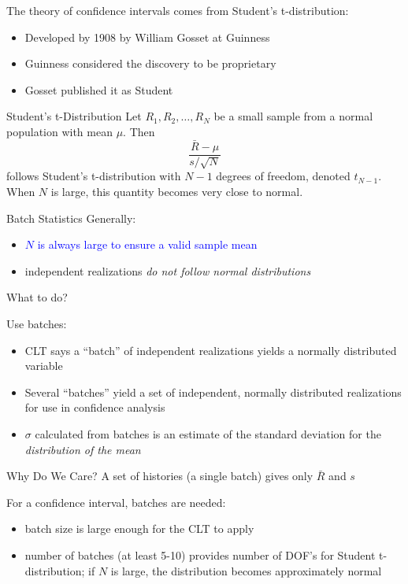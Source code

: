   The theory of confidence intervals comes from Student's t-distribution:
  \begin{itemize}
    \item Developed by 1908 by William Gosset at Guinness
    \item Guinness considered the discovery to be proprietary
    \item Gosset published it as Student
  \end{itemize}
  
{Student's t-Distribution}
 Let $R_{1}, R_{2}, \dots, R_{N}$ be a small sample from a 
 normal population with mean $\mu$. Then 
 \begin{equation*}
   \frac{\bar{R}-\mu}{s / \sqrt{N}}
 \end{equation*}
 follows Student's t-distribution with $N-1$ degrees of freedom, 
 denoted $t_{N-1}$.  \textcolor{mitred}{When $N$ is large, this quantity 
 becomes very close to normal.}
 

{Batch Statistics}
   Generally:
   \begin{itemize}
      
      \item \textcolor{blue}{$N$ is always large to ensure a valid sample mean}
      
      \item \textcolor{mitred}{independent realizations 
            \emph{do not follow normal distributions}}
   \end{itemize}
   What to do?
   
   
   Use batches:
   \begin{itemize}
     \item CLT says a ``batch'' of independent realizations yields a normally 
           distributed variable
     
     \item Several ``batches'' yield a set of independent, normally 
           distributed realizations for use in confidence analysis
     
     \item $\sigma$ calculated from batches is an estimate of 
           the standard deviation for the \emph{distribution of the mean} 
   \end{itemize}
  
{Why Do We Care?}
A set of histories (a single batch) gives only $\bar{R}$ and $s$
 
For a confidence interval, batches are needed:
\begin{itemize}
  \item batch size is large enough for the CLT to apply
  \item number of batches (at least 5-10) provides number of DOF's
        for Student t-distribution; if $N$ is large, the distribution 
        becomes approximately normal
\end{itemize}
 
